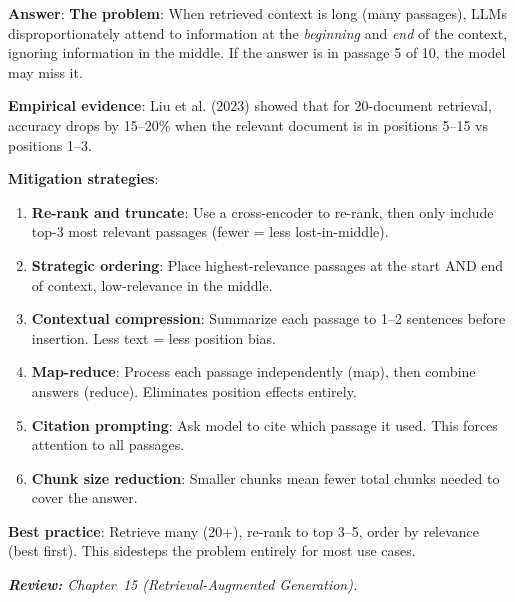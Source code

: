 \begin{questionbox}
\textbf{Answer}: \textbf{The problem}: When retrieved context is long (many passages), LLMs disproportionately attend to information at the \emph{beginning} and \emph{end} of the context, ignoring information in the middle. If the answer is in passage 5 of 10, the model may miss it.

\textbf{Empirical evidence}: Liu et al. (2023) showed that for 20-document retrieval, accuracy drops by 15--20\% when the relevant document is in positions 5--15 vs positions 1--3.

\textbf{Mitigation strategies}:

\begin{enumerate}
  \item \textbf{Re-rank and truncate}: Use a cross-encoder to re-rank, then only include top-3 most relevant passages (fewer = less lost-in-middle).
  \item \textbf{Strategic ordering}: Place highest-relevance passages at the start AND end of context, low-relevance in the middle.
  \item \textbf{Contextual compression}: Summarize each passage to 1--2 sentences before insertion. Less text = less position bias.
  \item \textbf{Map-reduce}: Process each passage independently (map), then combine answers (reduce). Eliminates position effects entirely.
  \item \textbf{Citation prompting}: Ask model to cite which passage it used. This forces attention to all passages.
  \item \textbf{Chunk size reduction}: Smaller chunks mean fewer total chunks needed to cover the answer.
\end{enumerate}

\textbf{Best practice}: Retrieve many (20+), re-rank to top 3--5, order by relevance (best first). This sidesteps the problem entirely for most use cases.

\emph{\textbf{Review:} Chapter~15 (Retrieval-Augmented Generation).}
\end{questionbox}

